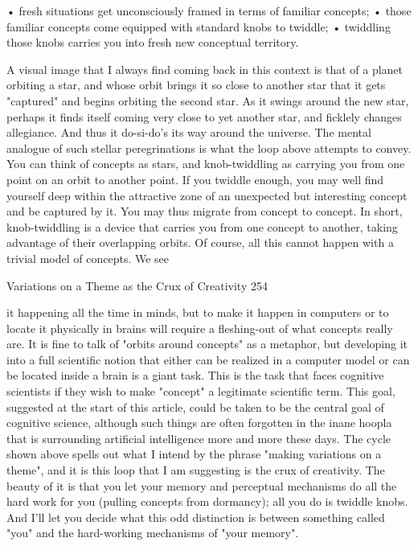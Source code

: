        • fresh situations get unconsciously framed in terms of familiar concepts;
       • those familiar concepts come equipped with standard knobs to twiddle;
       • twiddling those knobs carries you into fresh new conceptual territory.

        A visual image that I always find coming back in this context is that of a
planet orbiting a star, and whose orbit brings it so close to another star that it gets
"captured" and begins orbiting the second star. As it swings around the new star,
perhaps it finds itself coming very close to yet another star, and ficklely changes
allegiance. And thus it do-si-do's its way around the universe.
        The mental analogue of such stellar peregrinations is what the loop above
attempts to convey. You can think of concepts as stars, and knob-twiddling as
carrying you from one point on an orbit to another point. If you twiddle enough, you
may well find yourself deep within the attractive zone of an unexpected but
interesting concept and be captured by it. You may thus migrate from concept to
concept. In short, knob-twiddling is a device that carries you from one concept to
another, taking advantage of their overlapping orbits.
        Of course, all this cannot happen with a trivial model of concepts. We see




Variations on a Theme as the Crux of Creativity                                       254

it happening all the time in minds, but to make it happen in computers or to locate it
physically in brains will require a fleshing-out of what concepts really are. It is fine to
talk of "orbits around concepts" as a metaphor, but developing it into a full scientific
notion that either can be realized in a computer model or can be located inside a brain
is a giant task. This is the task that faces cognitive scientists if they wish to make
"concept" a legitimate scientific term. This goal, suggested at the start of this article,
could be taken to be the central goal of cognitive science, although such things are
often forgotten in the inane hoopla that is surrounding artificial intelligence more and
more these days.
        The cycle shown above spells out what I intend by the phrase "making
variations on a theme", and it is this loop that I am suggesting is the crux of creativity.
The beauty of it is that you let your memory and perceptual mechanisms do all the
hard work for you (pulling concepts from dormancy); all you do is twiddle knobs.
And I'll let you decide what this odd distinction is between something called "you"
and the hard-working mechanisms of "your memory".

